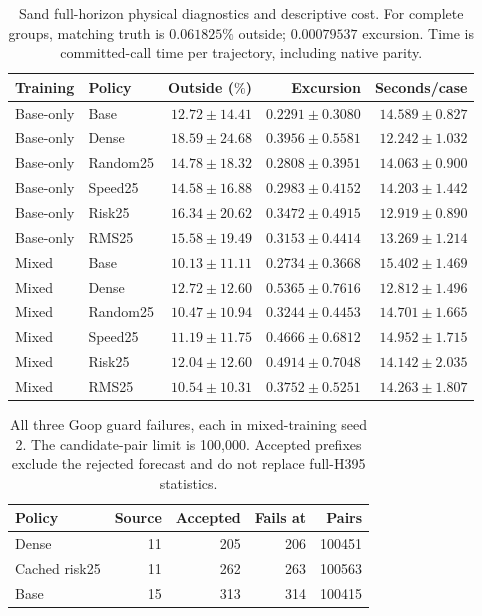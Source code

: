 \begin{table}[!ht]
\centering\small
\setlength{\tabcolsep}{5pt}\renewcommand{\arraystretch}{1.12}
\caption{Sand full-horizon physical diagnostics and descriptive cost. For complete groups, matching truth is $0.061825\%$ outside; $0.00079537$ excursion. Time is committed-call time per trajectory, including native parity.}
\label{tab:sand-all-cost}
\begin{tabular}{llrrr}
\toprule
Training & Policy & Outside ($\%$) & Excursion & Seconds/case\\
\midrule
Base-only & Base & $12.72\pm14.41$ & $0.2291\pm0.3080$ & $14.589\pm0.827$\\
Base-only & Dense & $18.59\pm24.68$ & $0.3956\pm0.5581$ & $12.242\pm1.032$\\
Base-only & Random25 & $14.78\pm18.32$ & $0.2808\pm0.3951$ & $14.063\pm0.900$\\
Base-only & Speed25 & $14.58\pm16.88$ & $0.2983\pm0.4152$ & $14.203\pm1.442$\\
Base-only & Risk25 & $16.34\pm20.62$ & $0.3472\pm0.4915$ & $12.919\pm0.890$\\
Base-only & RMS25 & $15.58\pm19.49$ & $0.3153\pm0.4414$ & $13.269\pm1.214$\\
Mixed & Base & $10.13\pm11.11$ & $0.2734\pm0.3668$ & $15.402\pm1.469$\\
Mixed & Dense & $12.72\pm12.60$ & $0.5365\pm0.7616$ & $12.812\pm1.496$\\
Mixed & Random25 & $10.47\pm10.94$ & $0.3244\pm0.4453$ & $14.701\pm1.665$\\
Mixed & Speed25 & $11.19\pm11.75$ & $0.4666\pm0.6812$ & $14.952\pm1.715$\\
Mixed & Risk25 & $12.04\pm12.60$ & $0.4914\pm0.7048$ & $14.142\pm2.035$\\
Mixed & RMS25 & $10.54\pm10.31$ & $0.3752\pm0.5251$ & $14.263\pm1.807$\\
\bottomrule
\end{tabular}
\end{table}

\begin{table}[!ht]\centering\small
\caption{All three Goop guard failures, each in mixed-training seed 2. The candidate-pair limit is 100,000. Accepted prefixes exclude the rejected forecast and do not replace full-H395 statistics.}
\label{tab:goop-all-failures}
\begin{tabular}{lrrrr}
\toprule
Policy & Source & Accepted & Fails at & Pairs\\
\midrule
Dense & 11 & 205 & 206 & 100451\\
Cached risk25 & 11 & 262 & 263 & 100563\\
Base & 15 & 313 & 314 & 100415\\
\bottomrule
\end{tabular}
\end{table}


